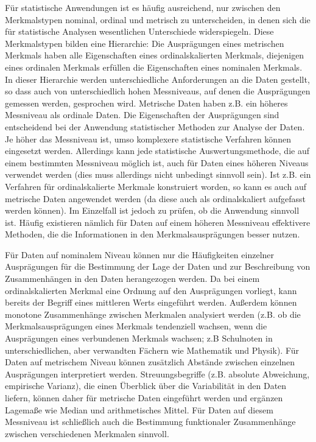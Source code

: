 \documentclass{lecture}
\begin{document}
    Für statistische Anwendungen ist es häufig ausreichend, nur zwischen den Merkmalstypen nominal, ordinal und metrisch zu unterscheiden, in denen sich die für statistische Analysen wesentlichen Unterschiede widerspiegeln.
    Diese Merkmalstypen bilden eine Hierarchie: Die Ausprägungen eines metrischen Merkmals haben alle Eigenschaften eines ordinalskalierten Merkmals, diejenigen eines ordinalen Merkmals erfüllen die Eigenschaften eines nominalen Merkmals.
    In dieser Hierarchie werden unterschiedliche Anforderungen an die Daten gestellt, so dass auch von unterschiedlich hohen Messniveaus, auf denen die Ausprägungen gemessen werden, gesprochen wird.
    Metrische Daten haben z.B. ein höheres Messniveau als ordinale Daten.
    Die Eigenschaften der Ausprägungen sind entscheidend bei der Anwendung statistischer Methoden zur Analyse der Daten.
    Je höher das Messniveau ist, umso komplexere statistische Verfahren können eingesetzt werden.
    Allerdings kann jede statistische Auswertungsmethode, die auf einem bestimmten Messniveau möglich ist, auch für Daten eines höheren Niveaus verwendet werden (dies muss allerdings nicht unbedingt sinnvoll sein).
    Ist z.B. ein Verfahren für ordinalskalierte Merkmale konstruiert worden, so kann es auch auf metrische Daten angewendet werden (da diese auch als ordinalskaliert aufgefasst werden können).
    Im Einzelfall ist jedoch zu prüfen, ob die Anwendung sinnvoll ist.
    Häufig existieren nämlich für Daten auf einem höheren Messniveau effektivere Methoden, die die Informationen in den Merkmalsausprägungen besser nutzen.

    Für Daten auf nominalem Niveau können nur die Häufigkeiten einzelner Ausprägungen für die Bestimmung der Lage der Daten und zur Beschreibung von Zusammenhängen in den Daten herangezogen werden.
    Da bei einem ordinalskalierten Merkmal eine Ordnung auf den Ausprägungen vorliegt, kann bereits der Begriff eines mittleren Werts eingeführt werden.
    Außerdem können monotone Zusammenhänge zwischen Merkmalen analysiert werden (z.B. ob die Merkmalsausprägungen eines Merkmals tendenziell wachsen, wenn die Ausprägungen eines verbundenen Merkmals wachsen; z.B Schulnoten in unterschiedlichen, aber verwandten Fächern wie Mathematik und Physik).
    Für Daten auf metrischem Niveau können zusätzlich Abstände zwischen einzelnen Ausprägungen interpretiert werden.
    Streuungsbegriffe (z.B. absolute Abweichung, empirische Varianz), die einen Überblick über die Variabilität in den Daten liefern, können daher für metrische Daten eingeführt werden und ergänzen Lagemaße wie Median und arithmetisches Mittel.
    Für Daten auf diesem Messniveau ist schließlich auch die Bestimmung funktionaler Zusammenhänge zwischen verschiedenen
    Merkmalen sinnvoll.
\end{document}
